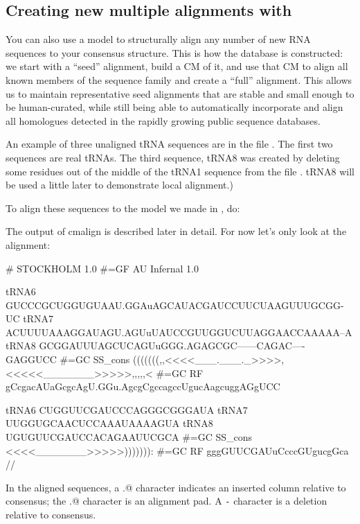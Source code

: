 \subsection{Creating new multiple alignments with }

You can also use a model to structurally align any number of new RNA
sequences to your consensus structure. This is how the 
database is constructed: we start with a ``seed'' alignment, build a CM
of it, and use that CM to align all known members of the sequence
family and create a ``full'' alignment. This allows us to maintain
representative seed alignments that are stable and small enough to be
human-curated, while still being able to automatically incorporate and
align all homologues detected in the rapidly growing public sequence
databases.

An example of three unaligned tRNA sequences are in the file
. The first two sequences are real tRNAs. The third
sequence, tRNA8 was created by deleting some residues out of the middle
of the tRNA1 sequence from the file . tRNA8 will be used a little later to
demonstrate local alignment.)

To align these sequences to the model we made in , do:


The output of cmalign is described later in detail. For now let's only
look at the alignment:

{\samepage
\begin{sreoutput}
# STOCKHOLM 1.0
#=GF AU Infernal 1.0

tRNA6        GUCCCGCUGGUGUAAU.GGAuAGCAUACGAUCCUUCUAAGUUUGCGG-UC
tRNA7        ACUUUUAAAGGAUAGU.AGUuUAUCCGUUGGUCUUAGGAACCAAAAA--A
tRNA8        GCGGAUUUAGCUCAGUuGGG.AGAGCGC------CAGAC----GAGGUCC
#=GC SS_cons (((((((,,<<<<___.___._>>>>,<<<<<_______>>>>>,,,,,<
#=GC RF      gCcgacAUaGcgcAgU.GGu.AgcgCgccagccUgucAagcuggAGgUCC

tRNA6        CUGGUUCGAUCCCAGGGCGGGAUA
tRNA7        UUGGUGCAACUCCAAAUAAAAGUA
tRNA8        UGUGUUCGAUCCACAGAAUUCGCA
#=GC SS_cons <<<<_______>>>>>))))))):
#=GC RF      gggGUUCGAUuCcccGUgucgGca
//
\end{sreoutput}
}

In the aligned sequences, a \verb@.@ character indicates an inserted
column relative to consensus; the \verb@.@ character is an alignment
pad. A \verb+-+ character is a deletion relative to consensus.

